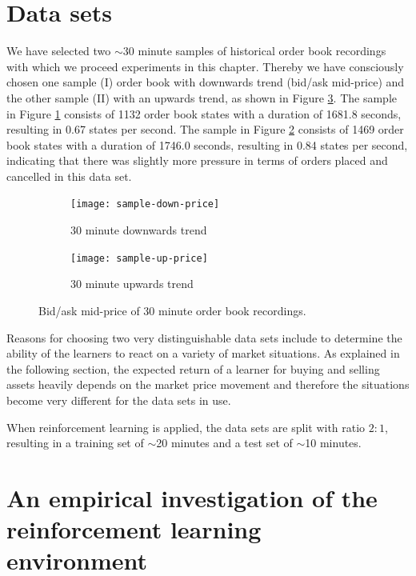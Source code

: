 \section{Data sets}
\label{sec:analysis-data-sets}
We have selected two $\sim$30 minute samples of historical order book recordings with which we proceed experiments in this chapter.
Thereby we have consciously chosen one sample (I) order book with downwards trend (bid/ask mid-price) and the other sample (II) with an upwards trend, as shown in Figure \ref{fig:sample-price}.
The sample in Figure \ref{fig:sample-down-price} consists of 1132 order book states with a duration of 1681.8 seconds, resulting in 0.67 states per second.
The sample in Figure \ref{fig:sample-up-price} consists of 1469 order book states with a duration of 1746.0 seconds, resulting in 0.84 states per second, indicating that there was slightly more pressure in terms of orders placed and cancelled in this data set.
\begin{figure}[H]
    \centering
    \begin{subfigure}[b]{0.45\textwidth}
        \texttt{[image: sample-down-price]}
        \caption{30 minute downwards trend}
        \label{fig:sample-down-price}
    \end{subfigure}
    \begin{subfigure}[b]{0.45\textwidth}
        \texttt{[image: sample-up-price]}
        \caption{30 minute upwards trend}
        \label{fig:sample-up-price}
    \end{subfigure}
    \caption{Bid/ask mid-price of 30 minute order book recordings.}
    \label{fig:sample-price}
\end{figure}
Reasons for choosing two very distinguishable data sets include to determine the ability of the learners to react on a variety of market situations.
As explained in the following section, the expected return of a learner for buying and selling assets heavily depends on the market price movement and therefore the situations become very different for the data sets in use.

When reinforcement learning is applied, the data sets are split with ratio $2:1$, resulting in a training set of $\sim$20 minutes and a test set of $\sim$10 minutes.

\section{An empirical investigation of the reinforcement learning environment}

